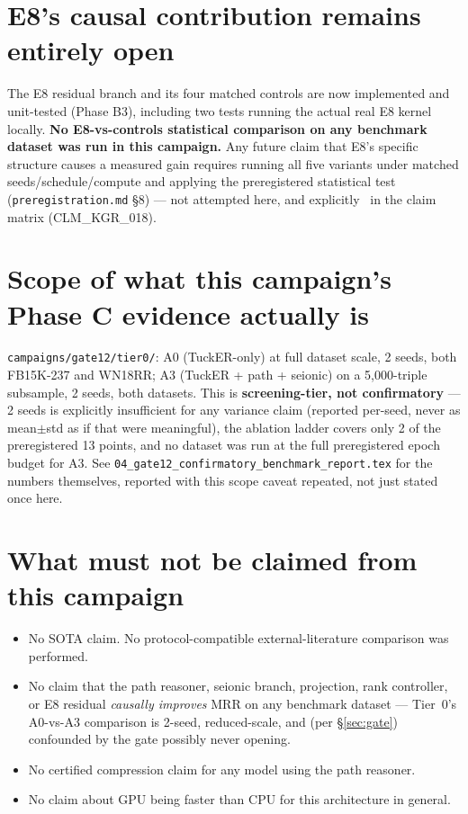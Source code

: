 \documentclass[11pt]{article}
\begin{document}
\section{E8's causal contribution remains entirely open}
The E8 residual branch and its four matched controls are now implemented and unit-tested
(Phase B3), including two tests running the actual real E8 kernel locally. \textbf{No
E8-vs-controls statistical comparison on any benchmark dataset was run in this campaign.} Any
future claim that E8's specific structure causes a measured gain requires running all five
variants under matched seeds/schedule/compute and applying the preregistered statistical test
(\texttt{preregistration.md} \S8) --- not attempted here, and explicitly \OpenC\ in the claim
matrix (CLM\_KGR\_018).

\section{Scope of what this campaign's Phase C evidence actually is}
\label{sec:scope}
\texttt{campaigns/gate12/tier0/}: A0 (TuckER-only) at full dataset scale, 2 seeds, both FB15K-237
and WN18RR; A3 (TuckER + path + seionic) on a 5,000-triple subsample, 2 seeds, both datasets. This
is \textbf{screening-tier, not confirmatory} --- 2 seeds is explicitly insufficient for any
variance claim (reported per-seed, never as mean$\pm$std as if that were meaningful), the ablation
ladder covers only 2 of the preregistered 13 points, and no dataset was run at the full
preregistered epoch budget for A3. See \texttt{04\_gate12\_confirmatory\_benchmark\_report.tex} for
the numbers themselves, reported with this scope caveat repeated, not just stated once here.

\section{What must not be claimed from this campaign}
\begin{itemize}
  \item No SOTA claim. No protocol-compatible external-literature comparison was performed.
  \item No claim that the path reasoner, seionic branch, projection, rank controller, or E8
        residual \emph{causally improves} MRR on any benchmark dataset --- Tier~0's A0-vs-A3
        comparison is 2-seed, reduced-scale, and (per \S\ref{sec:gate}) confounded by the gate
        possibly never opening.
  \item No certified compression claim for any model using the path reasoner.
  \item No claim about GPU being faster than CPU for this architecture in general.
\end{itemize}
\end{document}
